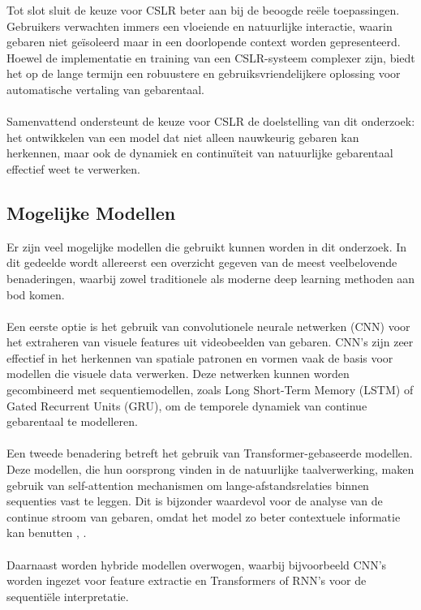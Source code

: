 Tot slot sluit de keuze voor CSLR beter aan bij de beoogde reële toepassingen. 
Gebruikers verwachten immers een vloeiende en natuurlijke interactie, waarin gebaren niet geïsoleerd maar in een doorlopende context worden gepresenteerd. 
Hoewel de implementatie en training van een CSLR-systeem complexer zijn, biedt het op de lange termijn een robuustere en gebruiksvriendelijkere oplossing voor automatische vertaling van gebarentaal.
\\
\\

Samenvattend ondersteunt de keuze voor CSLR de doelstelling van dit onderzoek: het ontwikkelen van een model dat niet alleen nauwkeurig gebaren kan herkennen, maar ook de dynamiek en continuïteit van natuurlijke gebarentaal effectief weet te verwerken.

\subsection{Mogelijke Modellen}
Er zijn veel mogelijke modellen die gebruikt kunnen worden in dit onderzoek. 
In dit gedeelde wordt allereerst een overzicht gegeven van de meest veelbelovende benaderingen, waarbij zowel traditionele als moderne deep learning methoden aan bod komen.
\\
\\
Een eerste optie is het gebruik van convolutionele neurale netwerken (CNN) voor het extraheren van visuele features uit videobeelden van gebaren. 
CNN's zijn zeer effectief in het herkennen van spatiale patronen en vormen vaak de basis voor modellen die visuele data verwerken\autocite{farahat2022novelfeaturescramblingapproachreveals}. 
Deze netwerken kunnen worden gecombineerd met sequentiemodellen, zoals Long Short-Term Memory (LSTM) of Gated Recurrent Units (GRU), om de temporele dynamiek van continue gebarentaal te modelleren\autocite{electronics13071229}.
\\
\\
Een tweede benadering betreft het gebruik van Transformer-gebaseerde modellen. 
Deze modellen, die hun oorsprong vinden in de natuurlijke taalverwerking, maken gebruik van self-attention mechanismen om lange-afstandsrelaties binnen sequenties vast te leggen. 
Dit is bijzonder waardevol voor de analyse van de continue stroom van gebaren, omdat het model zo beter contextuele informatie kan benutten \autocite{vaswani2023attentionneed}, \autocite{DU2022115}.
\\
\\
Daarnaast worden hybride modellen overwogen, waarbij bijvoorbeeld CNN's worden ingezet voor feature extractie en Transformers of RNN's voor de sequentiële interpretatie. 
